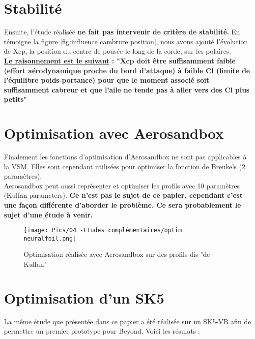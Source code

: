 \section{Stabilité}
\label{sec:Ch4.2}

Ensuite, l'étude réalisée \textbf{ne fait pas intervenir de critère de stabilité.} En témoigne la figure \ref{fig:influence cambrure position}, nous avons ajouté l'évolution de Xcp, la position du centre de pousée le long de la corde, sur les polaires.\\
\textbf{\underline{Le raisonnement est le suivant} : "Xcp doit être suffisamment faible (effort aérodynamique proche du bord d'attaque) à faible Cl (limite de l'équilibre poids-portance) pour que le moment associé soit suffisamment cabreur et que l'aile ne tende pas à aller vers des Cl plus petits"}



\section{Optimisation avec Aerosandbox}
\label{sec:Ch4.3}

Finalement les fonctions d'optimisation d'Aerosandbox ne sont pas applicables à la VSM. Elles sont cependant utilisées pour optimiser la fonction de Breukels (2 paramètres). \\
Aerosandbox peut aussi représenter et optimiser les profils avec 10 paramètres (Kulfan parameters). \textbf{Ce n'est pas le sujet de ce papier, cependant c'est une façon différente d'aborder le problème. Ce sera probablement le sujet d'une étude à venir.}

\begin{figure}[H]
    \centering
    \texttt{[image: Pics/04 -Etudes complémentaires/optim neuralfoil.png]}  
    \caption{Optimisation réalisée avec Aerosandbox sur des profils dis "de Kulfan"}
    \label{fig:kulfan}
\end{figure}


\section{Optimisation d'un SK5}
\label{sec:Ch4.4}

La même étude que présentée dans ce papier a été réalisée sur un SK5-VB afin de permettre un premier prototype pour Beyond. Voici les résulats :\\